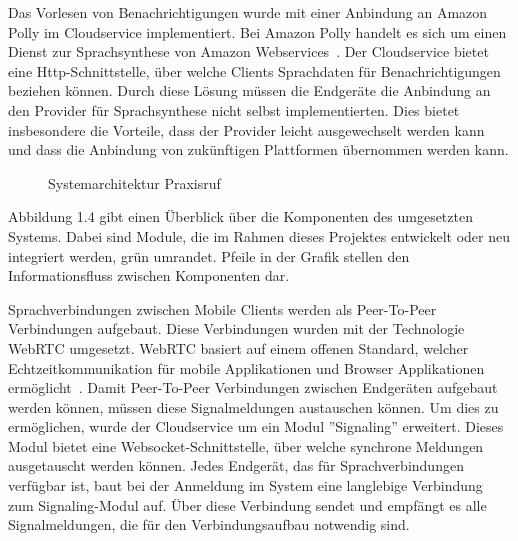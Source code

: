 Das Vorlesen von Benachrichtigungen wurde mit einer Anbindung an Amazon Polly im Cloudservice implementiert.
Bei Amazon Polly handelt es sich um einen Dienst zur Sprachsynthese von Amazon Webservices~\cite{aws_polly}.
Der Cloudservice bietet eine Http-Schnittstelle, über welche Clients Sprachdaten für Benachrichtigungen beziehen können.
Durch diese Lösung müssen die Endgeräte die Anbindung an den Provider für Sprachsynthese nicht selbst implementierten.
Dies bietet insbesondere die Vorteile, dass der Provider leicht ausgewechselt werden kann und dass die Anbindung von zukünftigen Plattformen übernommen werden kann.

\begin{figure}[h]
    \centering
    \begin{minipage}[b]{0.6\textwidth}
        \caption{Systemarchitektur Praxisruf}
    \end{minipage}
\end{figure}

Abbildung 1.4 gibt einen Überblick über die Komponenten des umgesetzten Systems.
Dabei sind Module, die im Rahmen dieses Projektes entwickelt oder neu integriert werden, grün umrandet.
Pfeile in der Grafik stellen den Informationsfluss zwischen Komponenten dar.

Sprachverbindungen zwischen Mobile Clients werden als Peer-To-Peer Verbindungen aufgebaut.
Diese Verbindungen wurden mit der Technologie WebRTC umgesetzt.
WebRTC basiert auf einem offenen Standard, welcher Echtzeitkommunikation für mobile Applikationen und Browser Applikationen ermöglicht~\cite{webrtc}.
Damit Peer-To-Peer Verbindungen zwischen Endgeräten aufgebaut werden können, müssen diese Signalmeldungen austauschen können.
Um dies zu ermöglichen, wurde der Cloudservice um ein Modul ''Signaling'' erweitert.
Dieses Modul bietet eine Websocket-Schnittstelle, über welche synchrone Meldungen ausgetauscht werden können.
Jedes Endgerät, das für Sprachverbindungen verfügbar ist, baut bei der Anmeldung im System eine langlebige Verbindung zum Signaling-Modul auf.
Über diese Verbindung sendet und empfängt es alle Signalmeldungen, die für den Verbindungsaufbau notwendig sind.


